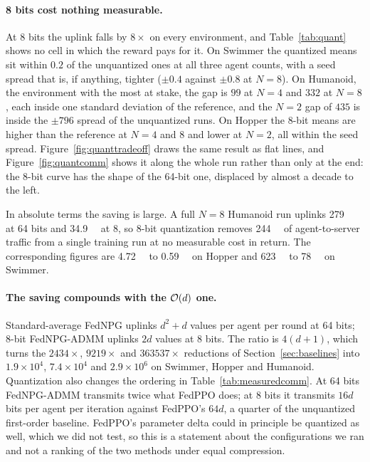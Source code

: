\paragraph{8 bits cost nothing measurable.} At 8 bits the uplink falls by
$8\times$ on every environment, and Table~\ref{tab:quant} shows no cell in
which the reward pays for it. On Swimmer the quantized means sit within $0.2$
of the unquantized ones at all three agent counts, with a seed spread that is,
if anything, tighter ($\pm 0.4$ against $\pm 0.8$ at $N=8$). On Humanoid, the
environment with the most at stake, the gap is $99$ at $N=4$ and $332$ at
$N=8$, each inside one standard deviation of the reference, and the $N=2$ gap
of $435$ is inside the $\pm 796$ spread of the unquantized runs. On Hopper the
8-bit means are higher than the reference at $N = 4$ and $8$ and lower at
$N = 2$, all within the seed spread. Figure~\ref{fig:quanttradeoff} draws the
same result as flat lines, and Figure~\ref{fig:quantcomm} shows it along the
whole run rather than only at the end: the 8-bit curve has the shape of the
64-bit one, displaced by almost a decade to the left.

In absolute terms the saving is large. A full $N=8$ Humanoid run uplinks
\SI{279}{\giga\byte} at 64 bits and \SI{34.9}{\giga\byte} at 8, so 8-bit
quantization removes \SI{244}{\giga\byte} of agent-to-server traffic from a
single training run at no measurable cost in return. The corresponding figures
are \SI{4.72}{\giga\byte} to \SI{0.59}{\giga\byte} on Hopper and
\SI{623}{\mega\byte} to \SI{78}{\mega\byte} on Swimmer.

\paragraph{The saving compounds with the $\mathcal{O}(d)$ one.} Standard-average FedNPG
uplinks $d^2 + d$ values per agent per round at 64 bits; 8-bit FedNPG-ADMM
uplinks $2d$ values at 8 bits. The ratio is $4(d+1)$, which turns the
$2434\times$, $9219\times$ and $363537\times$ reductions of
Section~\ref{sec:baselines} into $1.9 \times 10^4$, $7.4 \times 10^4$ and
$2.9 \times 10^6$ on Swimmer, Hopper and Humanoid. Quantization also changes
the ordering in Table~\ref{tab:measuredcomm}. At 64 bits FedNPG-ADMM transmits
twice what FedPPO does; at 8 bits it transmits $16d$ bits per agent per
iteration against FedPPO's $64d$, a quarter of the unquantized first-order
baseline. FedPPO's parameter delta could in principle be quantized as well,
which we did not test, so this is a statement about the configurations we ran
and not a ranking of the two methods under equal compression.

